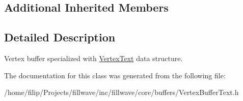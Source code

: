 \subsection*{Additional Inherited Members}


\subsection{Detailed Description}
Vertex buffer specialized with \hyperlink{structfillwave_1_1core_1_1VertexText}{Vertex\+Text} data structure. 

The documentation for this class was generated from the following file\+:\begin{DoxyCompactItemize}
\item 
/home/filip/\+Projects/fillwave/inc/fillwave/core/buffers/Vertex\+Buffer\+Text.\+h\end{DoxyCompactItemize}
